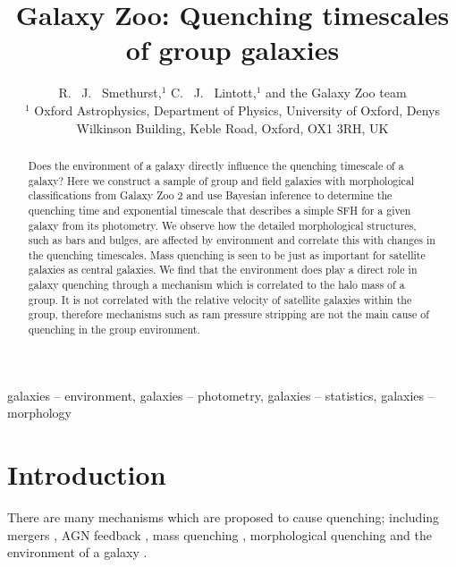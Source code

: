 \documentclass[useAMS,usenatbib]{mn2e}
\begin{document}
\title[Environmental quenching: yay or nay?]{Galaxy Zoo: Quenching timescales of group galaxies}
\author[Smethurst et al. 2015]{R. ~J. ~Smethurst,$^{1}$ C. ~J. ~Lintott,$^{1}$ and the Galaxy Zoo team \footnotemark[1]
\\ $^1$ Oxford Astrophysics, Department of Physics, University of Oxford, Denys Wilkinson Building, Keble Road, Oxford, OX1 3RH, UK 
}

\maketitle

\begin{abstract}
Does the environment of a galaxy directly influence the quenching timescale of a galaxy? Here we construct a sample of group and field galaxies with morphological classifications from Galaxy Zoo 2 and use Bayesian inference to determine the quenching time and exponential timescale that describes a simple SFH for a given galaxy from its photometry. We observe how the detailed morphological structures, such as bars and bulges, are affected by environment and correlate this with changes in the quenching timescales. Mass quenching is seen to be just as important for satellite galaxies as central galaxies.  We find that the environment does play a direct role in galaxy quenching through a mechanism which is correlated to the halo mass of a group. It is not correlated with the relative velocity of satellite galaxies within the group, therefore mechanisms such as ram pressure stripping are not the main cause of quenching in the group environment. 

\end{abstract}

\begin{keywords}
galaxies -- environment, galaxies -- photometry, galaxies -- statistics, galaxies -- morphology
\end{keywords}


\section{Introduction}\label{sec:intro}
 
 There are many mechanisms which are proposed to cause quenching; including mergers \citep{daddi10, darg10b, cheung12, barro13, pontzen16}, AGN feedback \citep{dimatteo05, nandra07}, mass quenching \citep{kennicutt87, peng12}, morphological quenching \citep{fang13} and the environment of a galaxy \citep[see review of mechanisms in][and references therein]{boselli06}.
 
\end{document}

